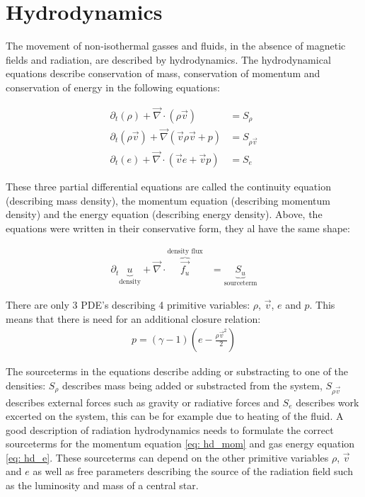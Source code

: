 \section{Hydrodynamics}
The movement of non-isothermal gasses and fluids, in the absence of magnetic fields and radiation, are described by hydrodynamics. The hydrodynamical equations describe conservation of mass, conservation of momentum and conservation of energy in the following equations:

\begin{align}
 \partial_t \left(\rho \right) + \vec{\nabla} \cdot \left( \rho \vec{v}  \right) &= S_\rho \label{eq: hd_rho}\\
 \partial_t \left(\rho \vec{v} \right) + \vec{\nabla} \left( \vec{v} \rho \vec{v} + p \right) &= S_{\rho \vec{v}} \label{eq: hd_mom}\\
 \partial_t \left(e \right) + \vec{\nabla} \cdot \left( \vec{v} e + \vec{v} p \right) &= S_e \label{eq: hd_e}
\end{align}

These three partial differential equations are called the continuity equation (describing mass density), the momentum equation (describing momentum density) and the energy equation (describing energy density). Above, the equations were written in their conservative form, they al have the same shape:

\begin{align}
	\partial_t \underbrace{u}_\text{density} + \vec{\nabla} \cdot \overbrace{\vec{f_u}}^\text{density flux} &= \underbrace{S_u}_\text{sourceterm} \label{eq: conservative}
\end{align}

There are only 3 PDE's describing 4 primitive variables: $\rho$, $\vec{v}$, $e$ and $p$. This means that there is need for an additional closure relation:
\begin{align}
	p = (\gamma - 1) \left(e - \frac{\rho \vec{v}^2}{2} \right) \label{gas_closing}
\end{align}

The sourceterms in the equations describe adding or substracting to one of the densities: $S_\rho$ describes mass being added or substracted from the system, $S_{\rho \vec{v}}$ describes external forces such as gravity or radiative forces and $S_e$ describes work excerted on the system, this can be for example due to heating of the fluid. A good description of radiation hydrodynamics needs to formulate the correct sourceterms for the momentum equation \eqref{eq: hd_mom} and gas energy equation \eqref{eq: hd_e}. These sourceterms can depend on the other primitive variables $\rho$, $\vec{v}$ and $e$ as well as free parameters describing the source of the radiation field such as the luminosity and mass of a central star.\\

